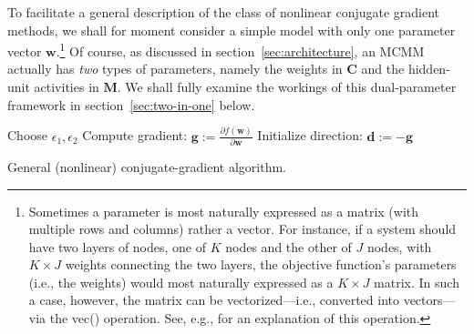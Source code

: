 To facilitate a general description of the class of nonlinear conjugate gradient methods, 
we shall for moment consider a simple model with only one parameter 
vector $\textbf{w}$.\footnote{Sometimes a parameter is most naturally expressed as a matrix (with multiple rows and columns) rather a vector. For instance, if a system should have two layers of nodes, one of $K$ nodes and the other of $J$ nodes, with $K \times J$ weights connecting the two layers, the objective function's parameters (i.e., the weights) would most naturally expressed as a  $K \times J$ matrix. In such a case, however, the matrix can be vectorized---i.e., converted into vectors---via the \textsf{vec()} operation. See, e.g., \citet{fackler:2005} for an explanation of this operation.} %
Of course, as discussed in section~\ref{sec:architecture},
an MCMM actually has \emph{two} types of parameters, namely
the weights in $\textbf{C}$ and the hidden-unit activities in $\textbf{M}$. 
We shall fully examine the workings of this dual-parameter framework in section~\ref{sec:two-in-one} below.
\begin{algorithm}[t]
 Choose $\epsilon_1, \epsilon_2$\;
 Compute gradient: $\textbf{g} := \frac{\partial f(\textbf{w})}{\partial \textbf{w}}$\;
Initialize direction: $\textbf{d} := -\textbf{g}$\; \label{line:init-d}
\caption{General (nonlinear) conjugate-gradient algorithm.}
\label{alg:gen-cg}
\end{algorithm}
